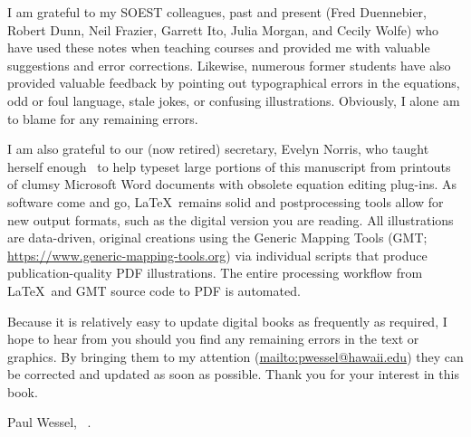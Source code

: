 I am grateful to my SOEST colleagues, past and present (Fred Duennebier, Robert Dunn, Neil Frazier,
Garrett Ito, Julia Morgan, and Cecily Wolfe) who have used these notes when teaching
courses and provided me with valuable suggestions and error corrections.  Likewise, numerous former students have
also provided valuable feedback by pointing out typographical errors in the equations, odd or foul language,
stale jokes, or confusing illustrations.  Obviously, I alone am to blame for any remaining errors.

I am also grateful to our (now retired) secretary, Evelyn Norris,
who taught herself enough \LaTheX\ to help typeset large portions of this manuscript from printouts of clumsy Microsoft Word documents
with obsolete equation editing plug-ins.  As software come and go, \LaTeX\ remains solid and postprocessing tools allow
for new output formats, such as the digital version you are reading.  All illustrations are data-driven, original creations using the
Generic Mapping Tools (GMT; \url{https://www.generic-mapping-tools.org}) via individual scripts that produce
publication-quality PDF illustrations.  The entire processing workflow from \LaTeX\ and GMT source code to PDF is automated.

Because it is relatively easy to update digital books as frequently as required, I hope to hear from you should you find any remaining errors
in the text or graphics.  By bringing them to my attention (\url{mailto:pwessel@hawaii.edu})
they can be corrected and updated as soon as possible.  Thank you for your interest in this book.

\vspace{2\baselineskip}
Paul Wessel, \DAmonth\ \DAyear.
